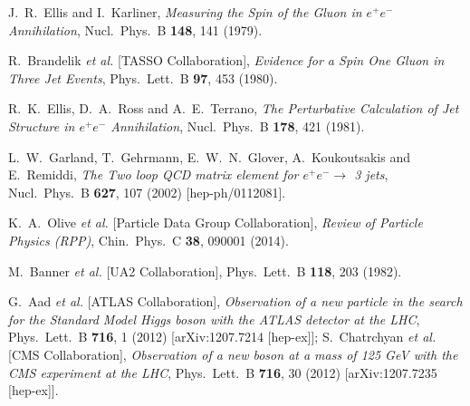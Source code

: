 \documentclass[12pt]{article} %
\begin{document}
\begin{thebibliography}{9}
J.~R.~Ellis and I.~Karliner,
{\it Measuring the Spin of the Gluon in $e^+ e^-$ Annihilation},
  Nucl.\ Phys.\ B {\bf 148}, 141 (1979).

R.~Brandelik {\it et al.}  [TASSO Collaboration],
{\it Evidence for a Spin One Gluon in Three Jet Events},
  Phys.\ Lett.\ B {\bf 97}, 453 (1980).
 
R.~K.~Ellis, D.~A.~Ross and A.~E.~Terrano,
{\it The Perturbative Calculation of Jet Structure in $e^+ e^-$ Annihilation},
  Nucl.\ Phys.\ B {\bf 178}, 421 (1981).

L.~W.~Garland, T.~Gehrmann, E.~W.~N.~Glover, A.~Koukoutsakis and E.~Remiddi,
 {\it The Two loop QCD matrix element for $e^+ e^- \to$ 3 jets},
  Nucl.\ Phys.\ B {\bf 627}, 107 (2002)
  [hep-ph/0112081].

K.~A.~Olive {\it et al.}  [Particle Data Group Collaboration],
{\it Review of Particle Physics (RPP)},
  Chin.\ Phys.\ C {\bf 38}, 090001 (2014).

M.~Banner {\it et al.}  [UA2 Collaboration],
  Phys.\ Lett.\ B {\bf 118}, 203 (1982).

G.~Aad {\it et al.}  [ATLAS Collaboration],
{\it Observation of a new particle in the search for the Standard Model Higgs boson with the ATLAS detector at the LHC},
  Phys.\ Lett.\ B {\bf 716}, 1 (2012)
  [arXiv:1207.7214 [hep-ex]];
  S.~Chatrchyan {\it et al.}  [CMS Collaboration],
{\it Observation of a new boson at a mass of 125 GeV with the CMS experiment at the LHC},
  Phys.\ Lett.\ B {\bf 716}, 30 (2012)
  [arXiv:1207.7235 [hep-ex]].

\end{thebibliography}
\end{document}
